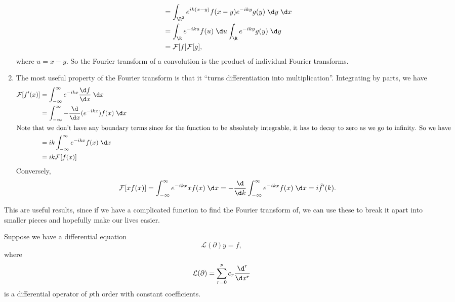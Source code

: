 \documentclass[a4paper]{article}
\begin{document}
\begin{enumerate}
\begin{align*}
      &= \int_{\R^2} e^{ik(x - y)} f(x - y) e^{-iky}g(y) \;\d y \;\d x\\
      &= \int_{\R} e^{-iku} f(u) \;\d u \int_{\R} e^{-iky} g(y)\;\d y\\
      &= \mathcal{F}[f] \mathcal{F}[g],
    \end{align*}
    where $u = x - y$. So the Fourier transform of a convolution is the product of individual Fourier transforms.
  \item The most useful property of the Fourier transform is that it ``turns differentiation into multiplication''. Integrating by parts, we have
    \begin{align*}
      \mathcal{F}[f'(x)] &= \int_{-\infty}^\infty e^{-ikx} \frac{\d f}{\d x}\;\d x\\
      &= \int_{-\infty}^\infty - \frac{\d}{\d x} (e^{-ikx}) f(x)\;\d x\\
      \intertext{Note that we don't have any boundary terms since for the function to be absolutely integrable, it has to decay to zero as we go to infinity. So we have}
      &= ik \int_{-\infty}^\infty e^{-ikx} f(x)\;\d x\\
      &= ik \mathcal{F}[f(x)]
    \end{align*}
    Conversely,
    \[
      \mathcal{F}[xf(x)] = \int_{-\infty}^\infty e^{-ikx} xf(x)\;\d x = - \frac{\d}{\d k}\int_{-\infty}^{\infty} e^{-ikx} f(x)\;\d x = i\tilde{f}'(k).
    \]
\end{enumerate}
This are useful results, since if we have a complicated function to find the Fourier transform of, we can use these to break it apart into smaller pieces and hopefully make our lives easier.

Suppose we have a differential equation
\[
  \mathcal{L}(\partial) y = f,
\]
where
\[
  \mathcal{L}(\partial) = \sum_{r = 0}^p c_r \frac{\d^r}{\d x^r}
\]
is a differential operator of $p$th order with constant coefficients.
\end{document}
